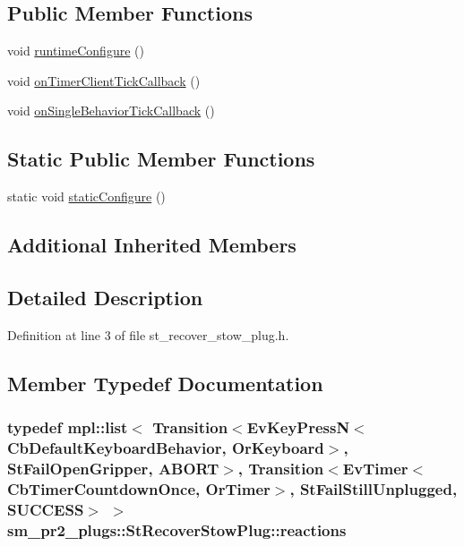 \subsection*{Public Member Functions}
\begin{DoxyCompactItemize}
\item 
void \hyperlink{structsm__pr2__plugs_1_1StRecoverStowPlug_a5f2f825961ceda59ed4811aaca86bbcf}{runtime\+Configure} ()
\item 
void \hyperlink{structsm__pr2__plugs_1_1StRecoverStowPlug_adda940da8f2073a8bcf5ce4d06baccf2}{on\+Timer\+Client\+Tick\+Callback} ()
\item 
void \hyperlink{structsm__pr2__plugs_1_1StRecoverStowPlug_af118f0e9ead8955ef7152fb8f55474ab}{on\+Single\+Behavior\+Tick\+Callback} ()
\end{DoxyCompactItemize}
\subsection*{Static Public Member Functions}
\begin{DoxyCompactItemize}
\item 
static void \hyperlink{structsm__pr2__plugs_1_1StRecoverStowPlug_a8ac2f706967a6f32561d26dfa894ce04}{static\+Configure} ()
\end{DoxyCompactItemize}
\subsection*{Additional Inherited Members}


\subsection{Detailed Description}


Definition at line 3 of file st\+\_\+recover\+\_\+stow\+\_\+plug.\+h.



\subsection{Member Typedef Documentation}
\subsubsection[{\texorpdfstring{reactions}{reactions}}]{\setlength{\rightskip}{0pt plus 5cm}typedef mpl\+::list$<$ Transition$<$Ev\+Key\+PressN$<$Cb\+Default\+Keyboard\+Behavior, {\bf Or\+Keyboard}$>$, {\bf St\+Fail\+Open\+Gripper}, {\bf A\+B\+O\+RT}$>$, Transition$<$Ev\+Timer$<$Cb\+Timer\+Countdown\+Once, {\bf Or\+Timer}$>$, {\bf St\+Fail\+Still\+Unplugged}, {\bf S\+U\+C\+C\+E\+SS}$>$ $>$ {\bf sm\+\_\+pr2\+\_\+plugs\+::\+St\+Recover\+Stow\+Plug\+::reactions}}\hypertarget{structsm__pr2__plugs_1_1StRecoverStowPlug_a44331b5028d908b5a20054cc2ddb1972}{}\label{structsm__pr2__plugs_1_1StRecoverStowPlug_a44331b5028d908b5a20054cc2ddb1972}


